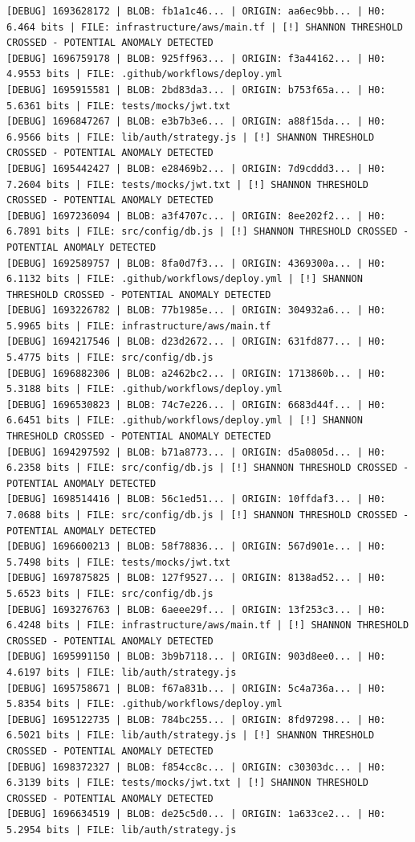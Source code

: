 \documentclass[12pt, a4paper, oneside]{report}
\begin{document}
\begin{lstlisting}[basicstyle=\tiny\ttfamily]
[DEBUG] 1693628172 | BLOB: fb1a1c46... | ORIGIN: aa6ec9bb... | H0: 6.464 bits | FILE: infrastructure/aws/main.tf | [!] SHANNON THRESHOLD CROSSED - POTENTIAL ANOMALY DETECTED
[DEBUG] 1696759178 | BLOB: 925ff963... | ORIGIN: f3a44162... | H0: 4.9553 bits | FILE: .github/workflows/deploy.yml
[DEBUG] 1695915581 | BLOB: 2bd83da3... | ORIGIN: b753f65a... | H0: 5.6361 bits | FILE: tests/mocks/jwt.txt
[DEBUG] 1696847267 | BLOB: e3b7b3e6... | ORIGIN: a88f15da... | H0: 6.9566 bits | FILE: lib/auth/strategy.js | [!] SHANNON THRESHOLD CROSSED - POTENTIAL ANOMALY DETECTED
[DEBUG] 1695442427 | BLOB: e28469b2... | ORIGIN: 7d9cddd3... | H0: 7.2604 bits | FILE: tests/mocks/jwt.txt | [!] SHANNON THRESHOLD CROSSED - POTENTIAL ANOMALY DETECTED
[DEBUG] 1697236094 | BLOB: a3f4707c... | ORIGIN: 8ee202f2... | H0: 6.7891 bits | FILE: src/config/db.js | [!] SHANNON THRESHOLD CROSSED - POTENTIAL ANOMALY DETECTED
[DEBUG] 1692589757 | BLOB: 8fa0d7f3... | ORIGIN: 4369300a... | H0: 6.1132 bits | FILE: .github/workflows/deploy.yml | [!] SHANNON THRESHOLD CROSSED - POTENTIAL ANOMALY DETECTED
[DEBUG] 1693226782 | BLOB: 77b1985e... | ORIGIN: 304932a6... | H0: 5.9965 bits | FILE: infrastructure/aws/main.tf
[DEBUG] 1694217546 | BLOB: d23d2672... | ORIGIN: 631fd877... | H0: 5.4775 bits | FILE: src/config/db.js
[DEBUG] 1696882306 | BLOB: a2462bc2... | ORIGIN: 1713860b... | H0: 5.3188 bits | FILE: .github/workflows/deploy.yml
[DEBUG] 1696530823 | BLOB: 74c7e226... | ORIGIN: 6683d44f... | H0: 6.6451 bits | FILE: .github/workflows/deploy.yml | [!] SHANNON THRESHOLD CROSSED - POTENTIAL ANOMALY DETECTED
[DEBUG] 1694297592 | BLOB: b71a8773... | ORIGIN: d5a0805d... | H0: 6.2358 bits | FILE: src/config/db.js | [!] SHANNON THRESHOLD CROSSED - POTENTIAL ANOMALY DETECTED
[DEBUG] 1698514416 | BLOB: 56c1ed51... | ORIGIN: 10ffdaf3... | H0: 7.0688 bits | FILE: src/config/db.js | [!] SHANNON THRESHOLD CROSSED - POTENTIAL ANOMALY DETECTED
[DEBUG] 1696600213 | BLOB: 58f78836... | ORIGIN: 567d901e... | H0: 5.7498 bits | FILE: tests/mocks/jwt.txt
[DEBUG] 1697875825 | BLOB: 127f9527... | ORIGIN: 8138ad52... | H0: 5.6523 bits | FILE: src/config/db.js
[DEBUG] 1693276763 | BLOB: 6aeee29f... | ORIGIN: 13f253c3... | H0: 6.4248 bits | FILE: infrastructure/aws/main.tf | [!] SHANNON THRESHOLD CROSSED - POTENTIAL ANOMALY DETECTED
[DEBUG] 1695991150 | BLOB: 3b9b7118... | ORIGIN: 903d8ee0... | H0: 4.6197 bits | FILE: lib/auth/strategy.js
[DEBUG] 1695758671 | BLOB: f67a831b... | ORIGIN: 5c4a736a... | H0: 5.8354 bits | FILE: .github/workflows/deploy.yml
[DEBUG] 1695122735 | BLOB: 784bc255... | ORIGIN: 8fd97298... | H0: 6.5021 bits | FILE: lib/auth/strategy.js | [!] SHANNON THRESHOLD CROSSED - POTENTIAL ANOMALY DETECTED
[DEBUG] 1698372327 | BLOB: f854cc8c... | ORIGIN: c30303dc... | H0: 6.3139 bits | FILE: tests/mocks/jwt.txt | [!] SHANNON THRESHOLD CROSSED - POTENTIAL ANOMALY DETECTED
[DEBUG] 1696634519 | BLOB: de25c5d0... | ORIGIN: 1a633ce2... | H0: 5.2954 bits | FILE: lib/auth/strategy.js
\end{lstlisting}
\end{document}
